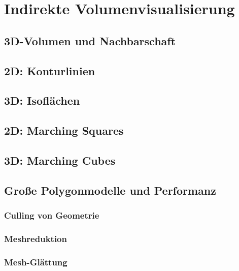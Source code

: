 \documentclass[a4paper, 11pt, accentcolor = tud3b]{tudreport}
\begin{document}
		\section{Indirekte Volumenvisualisierung} %

			\subsection{3D-Volumen und Nachbarschaft} %

			\subsection{2D: Konturlinien} %

			\subsection{3D: Isoflächen} %

			\subsection{2D: Marching Squares} %

			\subsection{3D: Marching Cubes} %

			\subsection{Große Polygonmodelle und Performanz} %

				\subsubsection{Culling von Geometrie} %

				\subsubsection{Meshreduktion} %

				\subsubsection{Mesh-Glättung} %
\end{document}
